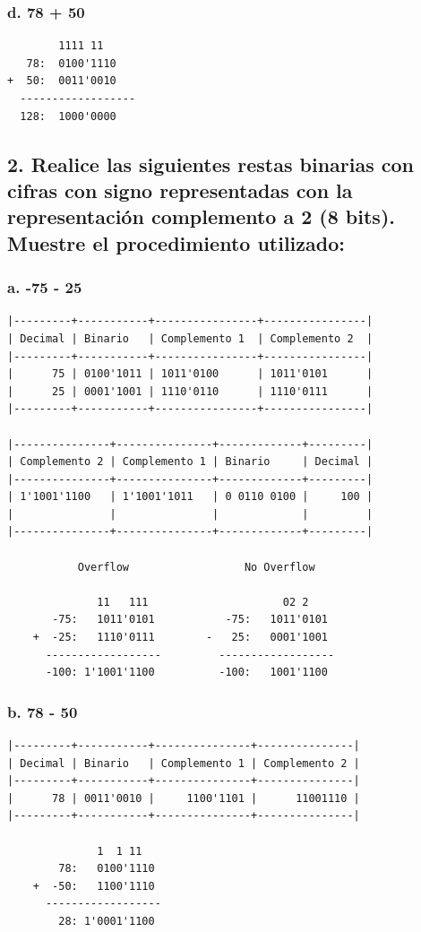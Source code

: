 \documentclass[12pt]{article}
\begin{document}
\subsubsection*{d. 78 + 50}
\label{sec:org826539b}
\begin{verbatim}
        1111 11
   78:  0100'1110 
+  50:  0011'0010 
  ------------------
  128:  1000'0000
\end{verbatim}

\subsection*{2. Realice las siguientes restas binarias con cifras con signo representadas con la representación complemento a 2 (8 bits). Muestre el procedimiento utilizado:}
\label{sec:orgc1b3ebc}
\subsubsection*{a. -75 - 25}
\label{sec:orgdd6d5fb}
\begin{verbatim}
|---------+-----------+----------------+----------------|
| Decimal | Binario   | Complemento 1  | Complemento 2  |
|---------+-----------+----------------+----------------|
|      75 | 0100'1011 | 1011'0100      | 1011'0101      |
|      25 | 0001'1001 | 1110'0110      | 1110'0111      |
|---------+-----------+----------------+----------------|

|---------------+---------------+-------------+---------|
| Complemento 2 | Complemento 1 | Binario     | Decimal |
|---------------+---------------+-------------+---------|
| 1'1001'1100   | 1'1001'1011   | 0 0110 0100 |     100 |
|               |               |             |         |
|---------------+---------------+-------------+---------|

           Overflow                  No Overflow

              11   111                     02 2    
       -75:   1011'0101           -75:   1011'0101             
    +  -25:   1110'0111        -   25:   0001'1001 
      ------------------         ------------------    
      -100: 1'1001'1100          -100:   1001'1100
\end{verbatim}

\subsubsection*{b. 78 - 50}
\label{sec:org29eb33f}
\begin{verbatim}
|---------+-----------+---------------+---------------|
| Decimal | Binario   | Complemento 1 | Complemento 2 |
|---------+-----------+---------------+---------------|
|      78 | 0011'0010 |     1100'1101 |      11001110 |
|---------+-----------+---------------+---------------|

              1  1 11
        78:   0100'1110    
    +  -50:   1100'1110
      ------------------      
        28: 1'0001'1100
\end{verbatim}
\end{document}

